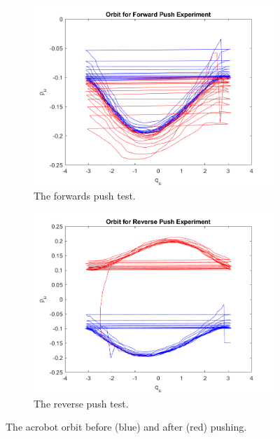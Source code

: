 \documentclass[journal,twoside,web]{ieeecolor}
\begin{document}
\begin{figure}
    \centering
    \begin{subfigure}[ht]{0.49\linewidth}
        \includegraphics[width=\linewidth]{acrobot_fpush_orbit.png}
        \caption{The forwards push test.}
        \label{fig:acrobot-fpush-orbit}
    \end{subfigure}
    \begin{subfigure}[ht]{0.49\linewidth}
        \includegraphics[width=\linewidth]{acrobot_rpush_orbit.png}
        \caption{The reverse push test.}
        \label{fig:acrobot-rpush-orbit}
    \end{subfigure}
    \caption{The acrobot orbit before (blue) and after (red) pushing.}
\end{figure}
\end{document}
